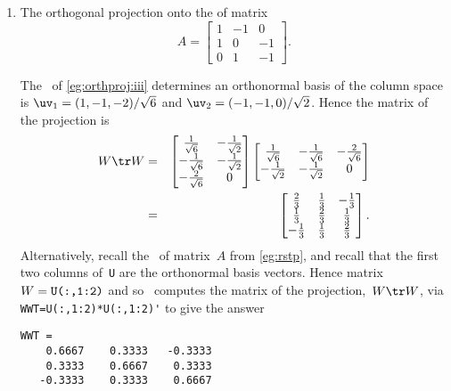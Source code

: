 \begin{example}
\begin{enumerate}
\item The orthogonal projection onto the  of matrix
\begin{equation*}
A=\begin{bmatrix} 1&-1&0\\ 1&0&-1\\ 0&1&-1 \end{bmatrix}.
\end{equation*}
\begin{solution} 
The \svd\ of \cref{eg:orthproj:iii} determines an orthonormal basis of the column space is \(\uv_1=(1,-1,-2)/\sqrt6\) and \(\uv_2=(-1,-1,0)/\sqrt2\).
Hence the matrix of the projection is
\begin{eqnarray*}
W\tr W&=&\begin{bmatrix} \frac1{\sqrt6}&-\frac1{\sqrt2}\\-\frac1{\sqrt6}&-\frac1{\sqrt2}\\-\frac2{\sqrt6}&0 \end{bmatrix}
\begin{bmatrix} \frac1{\sqrt6}&-\frac1{\sqrt6}&-\frac2{\sqrt6}\\ -\frac1{\sqrt2}&-\frac1{\sqrt2}&0\end{bmatrix}
\\&=&\begin{bmatrix} \frac23&\frac13&-\frac13\\\frac13&\frac23&\frac13\\-\frac13&\frac13&\frac23 \end{bmatrix}.
\end{eqnarray*}
Alternatively, recall the \svd\ of matrix~\(A\) from \cref{eg:rstp}, and recall that the first two columns of~\verb|U| are the orthonormal basis vectors.  
Hence matrix \(W=\verb|U(:,1:2)|\) and so \script\ computes the matrix of the projection,~\(W\tr W\), via \verb|WWT=U(:,1:2)*U(:,1:2)'| to give the answer
\setbox\ajrqrbox\hbox{}%
\marginajrbox%
\begin{verbatim}
WWT =
    0.6667    0.3333   -0.3333
    0.3333    0.6667    0.3333
   -0.3333    0.3333    0.6667
\end{verbatim}
\end{solution}



\end{enumerate}
\end{example}
